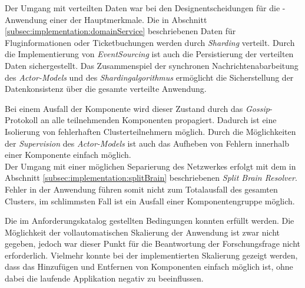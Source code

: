 \begin{enumerate}
    Der Umgang mit verteilten Daten war bei den Designentscheidungen für die -Anwendung einer der Hauptmerkmale. Die in Abschnitt \ref{subsec:implementation:domainService} beschriebenen Daten für Fluginformationen oder Ticketbuchungen werden durch \textit{Sharding} verteilt. Durch die Implementierung von \textit{EventSourcing} ist auch die Persistierung der verteilten Daten sichergestellt. Das Zusammenspiel der synchronen Nachrichtenabarbeitung des \textit{Actor-Models} und des \textit{Shardingalgorithmus} ermöglicht die Sicherstellung der Datenkonsistenz über die gesamte verteilte Anwendung.
   
    Bei einem Ausfall der Komponente wird dieser Zustand durch das \textit{Gossip}-Protokoll an alle teilnehmenden Komponenten propagiert. Dadurch ist eine Isolierung von fehlerhaften Clusterteilnehmern möglich. Durch die Möglichkeiten der \textit{Supervision} des \textit{Actor-Models} ist auch das Aufheben von Fehlern innerhalb einer Komponente einfach möglich. \\
    Der Umgang mit einer möglichen Separierung des Netzwerkes erfolgt mit dem in Abschnitt \ref{subsec:implementation:splitBrain} beschriebenen \textit{Split Brain Resolver}. Fehler in der Anwendung führen somit nicht zum Totalausfall des gesamten Clusters, im schlimmsten Fall ist ein Ausfall einer Komponentengruppe möglich.
\end{enumerate}
Die im Anforderungskatalog gestellten Bedingungen konnten  erfüllt werden. Die Möglichkeit der vollautomatischen Skalierung der Anwendung ist zwar nicht gegeben, jedoch war dieser Punkt für die Beantwortung der Forschungsfrage nicht erforderlich. Vielmehr konnte bei der implementierten Skalierung gezeigt werden, dass das Hinzufügen und Entfernen von Komponenten einfach möglich ist, ohne dabei die laufende Applikation negativ zu beeinflussen. 

